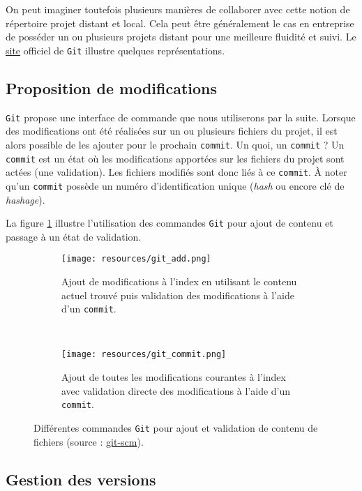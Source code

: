 \documentclass[11pt,a4paper,oneside]{article}
\begin{document}
\vspace{2mm}
On peut imaginer toutefois plusieurs manières de collaborer avec cette notion de répertoire projet distant et local. Cela peut être généralement le cas en entreprise de posséder un ou plusieurs projets distant pour une meilleure fluidité et suivi. Le \href{https://git-scm.com/about/distributed}{site} officiel de \texttt{Git} illustre quelques représentations.

\subsection{Proposition de modifications}

\texttt{Git} propose une interface de commande que nous utiliserons par la suite. Lorsque des modifications ont été réalisées sur un ou plusieurs fichiers du projet, il est alors possible de les ajouter pour le prochain \texttt{commit}. Un quoi, un \texttt{commit} ? Un \texttt{commit} est un état où les modifications apportées sur les fichiers du projet sont actées (une validation). Les fichiers modifiés sont donc liés à ce \texttt{commit}. À noter qu'un \texttt{commit} possède un numéro d'identification unique (\textit{hash} ou encore clé de \textit{hashage}).

\vspace{2mm}
La figure \ref{fig:git_add_command} illustre l'utilisation des commandes \texttt{Git} pour ajout de contenu et passage à un état de validation.
\begin{figure}[ht]
	\centering
	\begin{subfigure}{.395\textwidth}
		\texttt{[image: resources/git\_add.png]}
		\caption{Ajout de modifications à l’index en utilisant le contenu actuel trouvé puis validation des modifications à l'aide d'un \texttt{commit}.}
	\end{subfigure}
	~
	\begin{subfigure}{.41\textwidth}
		\texttt{[image: resources/git\_commit.png]}
		\caption{Ajout de toutes les modifications courantes à l’index avec validation directe des modifications à l'aide d'un \texttt{commit}.}
	\end{subfigure}
	\caption{Différentes commandes \texttt{Git} pour ajout et validation de contenu de fichiers (source : \href{https://git-scm.com/about/staging-aread}{git-scm}).}
	\label{fig:git_add_command}
\end{figure}

\subsection{Gestion des versions}
\end{document}

